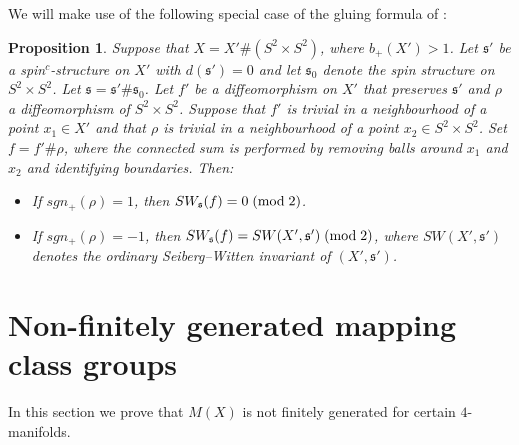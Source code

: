\documentclass{amsart}
\newtheorem{proposition}[theorem]{Proposition}
\theoremstyle{definition}
\theoremstyle{remark}
\numberwithin{equation}{section}
\begin{document}
We will make use of the following special case of the gluing formula of \cite{bk1}:
\begin{proposition}\label{prop:glue}
Suppose that $X = X' \# (S^2 \times S^2)$, where $b_+(X') > 1$. Let $\mathfrak{s}'$ be a spin$^c$-structure on $X'$ with $d(\mathfrak{s}') = 0$ and let $\mathfrak{s}_0$ denote the spin structure on $S^2 \times S^2$. Let $\mathfrak{s} = \mathfrak{s}' \# \mathfrak{s}_0$. Let $f'$ be a diffeomorphism on $X'$ that preserves $\mathfrak{s}'$ and $\rho$ a diffeomorphism of $S^2 \times S^2$. Suppose that $f'$ is trivial in a neighbourhood of a point $x_1 \in X'$ and that $\rho$ is trivial in a neighbourhood of a point $x_2 \in S^2 \times S^2$. Set $f = f' \# \rho$, where the connected sum is performed by removing balls around $x_1$ and $x_2$ and identifying boundaries. Then:
\begin{itemize}
\item[(1)]{If $sgn_+(\rho) = 1$, then $SW_{\mathfrak{s}}(f) = 0 \; ({\rm mod} \; 2)$.}
\item[(2)]{If $sgn_+(\rho) = -1$, then $SW_{\mathfrak{s}}(f) = SW(X' , \mathfrak{s}') \; ({\rm mod} \; 2)$, where $SW(X' , \mathfrak{s}')$ denotes the ordinary Seiberg--Witten invariant of $(X' , \mathfrak{s}')$.}
\end{itemize}
\end{proposition}




\section{Non-finitely generated mapping class groups}\label{sec:sw2}

In this section we prove that $M(X)$ is not finitely generated for certain $4$-manifolds.
\end{document}
